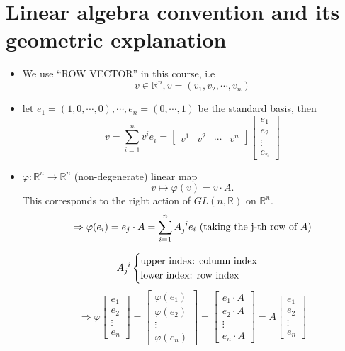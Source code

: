\section{Linear algebra convention and its geometric explanation}
\begin{itemize}
    \item We use ``ROW VECTOR'' in this course, i.e
    \[v\in \mathbb{R}^n, v=(v_1,v_2,\cdots,v_n)\]
    \item let $e_1=(1,0,\cdots,0),\cdots,e_n=(0,\cdots,1)$ be the standard basis, then 
    \[v=\sum_{i=1}^nv^i e_i=
    \begin{bmatrix}
        v^1& v^2& \cdots & v^n
    \end{bmatrix}
    \begin{bmatrix}
        e_1\\
        e_2\\
        \vdots\\
        e_n
    \end{bmatrix}
    \]
    \item $\varphi\colon \mathbb{R}^n\to \mathbb{R}^n$ (non-degenerate) linear map
    \[v\mapsto \varphi(v)=v\cdot A.\]
    This corresponds to the right action of $GL(n,\mathbb{R})$ on $\mathbb{R}^n$.
    \[\Rightarrow \varphi(e_i)=e_j \cdot A=\sum_{i=1}^n A\indices{_j^i}e_i\text{ (taking the j-th row of }A\text{)}\]
    
    \[A\indices{_j^i}\begin{cases}
        \text{upper index: column index}\\
        \text{lower index: row index}
    \end{cases}\]
    \[\Rightarrow \varphi\begin{bmatrix}
        e_1\\
        e_2\\
        \vdots\\
        e_n
    \end{bmatrix}=\begin{bmatrix}
       \varphi( e_1)\\
        \varphi (e_2)\\
        \vdots\\
        \varphi(e_n)
    \end{bmatrix}=\begin{bmatrix}
        e_1\cdot A\\
        e_2\cdot A\\
        \vdots\\
        e_n\cdot A
    \end{bmatrix}=
    A \begin{bmatrix}
        e_1\\
        e_2\\
        \vdots\\
        e_n
    \end{bmatrix}\]
\end{itemize}
